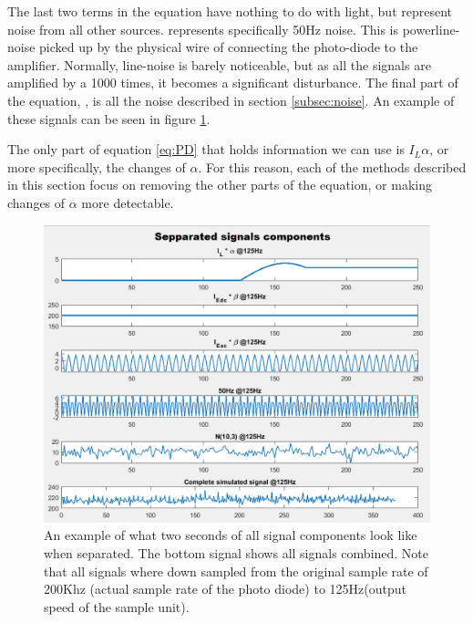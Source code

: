 The last two terms in the equation have nothing to do with light, but represent noise from all other sources.  represents specifically 50Hz noise. This is powerline-noise picked up by the physical wire of connecting the photo-diode to the amplifier. Normally, line-noise is barely noticeable, but as all the signals are amplified by a 1000 times, it becomes a significant disturbance. The final part of the equation, , is all the noise described in section \ref{subsec:noise}. An example of these signals can be seen in figure \ref{fig:SepparatedSignals}.

The only part of equation \ref{eq:PD} that holds information we can use is $I_{L} \alpha$, or more specifically, the changes of $\alpha$. For this reason, each of the methods described in this section focus on removing the other parts of the equation, or making changes of $\alpha$ more detectable.

\begin{figure}
	\includegraphics[width=\textwidth]{pics/sepparatedsignals.png}
	\caption{An example of what two seconds of all signal components look like when separated. The bottom signal shows all signals combined. Note that all signals where down sampled from the original sample rate of 200Khz (actual sample rate of the photo diode) to 125Hz(output speed of the sample unit).}
	\label{fig:SepparatedSignals}
\end{figure}

